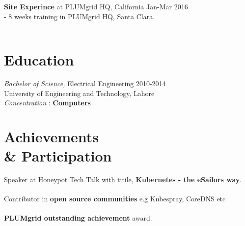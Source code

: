 \documentclass[margin]{res}
\begin{document}
\begin{resume}
\textbf{Site Experince} at PLUMgrid HQ, California \hfill     Jan-Mar 2016 \\
- 8 weeks training in PLUMgrid HQ, Santa Clara.   \\ \\

\section{Education} {\sl Bachelor of Science,} Electrical Engineering \hfill 2010-2014 \\
                University of Engineering and Technology, Lahore \\
	             \textit{Concentration} : \textbf{Computers}

\section{Achievements \\ \& Participation} Speaker at Honeypot Tech Talk with titile, \textbf{Kubernetes - the eSailors way}. \\ \\
Contributor in \textbf{open source communities} e.g Kubespray, CoreDNS etc \\ \\
\textbf{PLUMgrid outstanding achievement} award.
\end{resume}
\end{document}
